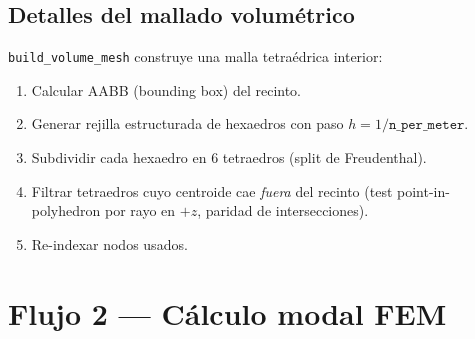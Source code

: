 \documentclass[11pt,a4paper]{article}
\begin{document}
\subsection*{Detalles del mallado volumétrico}

\texttt{build\_volume\_mesh} construye una malla tetraédrica interior:

\begin{enumerate}[itemsep=2pt]
  \item Calcular AABB (bounding box) del recinto.
  \item Generar rejilla estructurada de hexaedros con paso $h = 1/\texttt{n\_per\_meter}$.
  \item Subdividir cada hexaedro en 6 tetraedros (split de Freudenthal).
  \item Filtrar tetraedros cuyo centroide cae \emph{fuera} del recinto
        (test point-in-polyhedron por rayo en $+z$, paridad de intersecciones).
  \item Re-indexar nodos usados.
\end{enumerate}

\section{Flujo 2 — Cálculo modal FEM}
\end{document}
